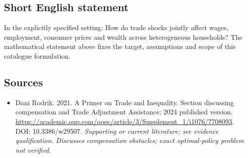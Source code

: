 \documentclass[11pt]{article}
\begin{document}
\subsection{Short English statement}
In the explicitly specified setting: How do trade shocks jointly affect wages, employment, consumer prices and wealth across heterogeneous households? The mathematical statement above fixes the target, assumptions and scope of this catalogue formulation.

\subsection{Sources}
\begin{itemize}\raggedright
\item[\textnormal{[S1]}]\hypertarget{source:30007622:1}{} Dani Rodrik. 2021. A Primer on Trade and Inequality. Section discussing compensation and Trade Adjustment Assistance; 2024 published version.
\url{https://academic.oup.com/ooec/article/3/Supplement_1/i1076/7708093}.
DOI: 10.3386/w29507.
{\small\textit{Supporting or current literature; see evidence qualification. Discusses compensation obstacles; exact optimal-policy problem not verified.}}
\end{itemize}
\end{document}
